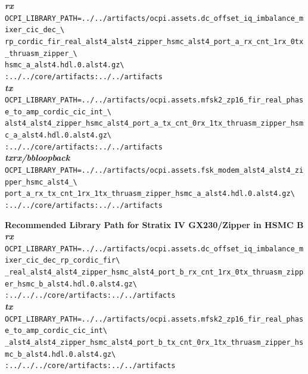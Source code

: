 \noindent
\noindent\textbf{\textit{rx}}\\
\noindent
\verb|OCPI_LIBRARY_PATH=../../artifacts/ocpi.assets.dc_offset_iq_imbalance_mixer_cic_dec_\| \\
\verb|rp_cordic_fir_real_alst4_alst4_zipper_hsmc_alst4_port_a_rx_cnt_1rx_0tx_thruasm_zipper_\| \\
\verb|hsmc_a_alst4.hdl.0.alst4.gz\| \\
\verb|:../../core/artifacts:../../artifacts| \\

\noindent\textbf{\textit{tx}}\\
\verb|OCPI_LIBRARY_PATH=../../artifacts/ocpi.assets.mfsk2_zp16_fir_real_phase_to_amp_cordic_cic_int_\| \\
\verb|alst4_alst4_zipper_hsmc_alst4_port_a_tx_cnt_0rx_1tx_thruasm_zipper_hsmc_a_alst4.hdl.0.alst4.gz\| \\
\verb|:../../core/artifacts:../../artifacts| \\

\noindent\textbf{\textit{txrx/bbloopback}}\\
\verb|OCPI_LIBRARY_PATH=../../artifacts/ocpi.assets.fsk_modem_alst4_alst4_zipper_hsmc_alst4_\| \\
\verb|port_a_rx_tx_cnt_1rx_1tx_thruasm_zipper_hsmc_a_alst4.hdl.0.alst4.gz\| \\
\verb|:../../core/artifacts:../../artifacts| \\
\par\medskip

\noindent\textbf{Recommended Library Path for Stratix IV GX230/Zipper in HSMC B}\\

\noindent\textbf{\textit{rx}}\\
\verb|OCPI_LIBRARY_PATH=../../artifacts/ocpi.assets.dc_offset_iq_imbalance_mixer_cic_dec_rp_cordic_fir\| \\
\verb|_real_alst4_alst4_zipper_hsmc_alst4_port_b_rx_cnt_1rx_0tx_thruasm_zipper_hsmc_b_alst4.hdl.0.alst4.gz\| \\
\verb|:../../../core/artifacts:../../artifacts| \\

\noindent\textbf{\textit{tx}}\\
\verb|OCPI_LIBRARY_PATH=../../artifacts/ocpi.assets.mfsk2_zp16_fir_real_phase_to_amp_cordic_cic_int\| \\
\verb|_alst4_alst4_zipper_hsmc_alst4_port_b_tx_cnt_0rx_1tx_thruasm_zipper_hsmc_b_alst4.hdl.0.alst4.gz\| \\
\verb|:../../../core/artifacts:../../artifacts| \\

